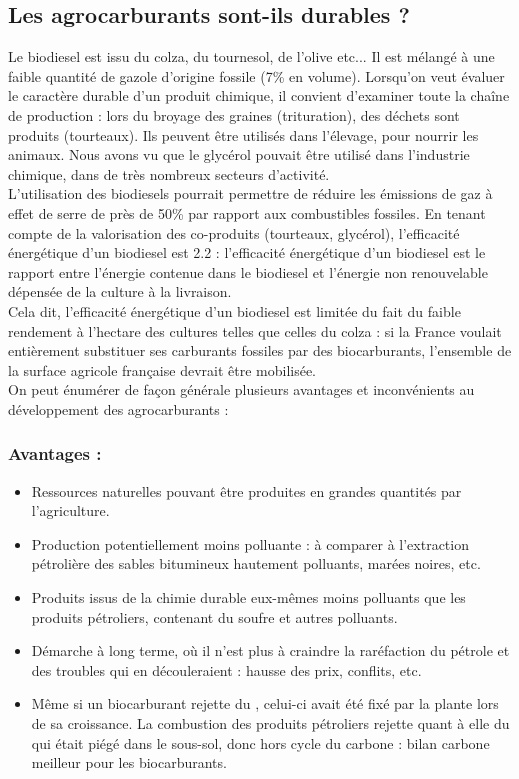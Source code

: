 \documentclass[11pt,a4paper]{report}
\begin{document}
\subsection{Les agrocarburants sont-ils durables ?}

Le biodiesel est issu du colza, du tournesol, de l'olive etc... Il est mélangé à une faible quantité de gazole d'origine fossile (7\% en volume). Lorsqu'on veut évaluer le caractère durable d'un produit chimique, il convient d'examiner toute la chaîne de production : lors du broyage des graines (trituration), des déchets sont produits (tourteaux). Ils peuvent être utilisés dans l'élevage, pour nourrir les animaux. Nous avons vu que le glycérol pouvait être utilisé dans l'industrie chimique, dans de très nombreux secteurs d'activité.\\

L'utilisation des biodiesels pourrait permettre de réduire les émissions de gaz à effet de serre de près de 50\% par rapport aux combustibles fossiles. En tenant compte de la valorisation des co-produits (tourteaux, glycérol), l'efficacité énergétique d'un biodiesel est 2.2 : l'efficacité énergétique d'un biodiesel est le rapport entre l'énergie contenue dans le biodiesel et l'énergie non renouvelable dépensée de la culture à la livraison.\\

Cela dit, l'efficacité énergétique d'un biodiesel est limitée du fait du faible rendement à l'hectare des cultures telles que celles du colza :  si la France voulait entièrement substituer ses carburants fossiles par des biocarburants, l'ensemble de la surface agricole française devrait être mobilisée.\\ 

On peut énumérer de façon générale plusieurs avantages et inconvénients au développement des agrocarburants :

\subsubsection{Avantages :}
\begin{itemize}
	\item Ressources naturelles pouvant être produites en grandes quantités par l'agriculture.
	\item Production potentiellement moins polluante : à comparer à l'extraction pétrolière des sables 			bitumineux hautement polluants, marées noires, etc.
	\item Produits issus de la chimie durable eux-mêmes moins polluants que les produits pétroliers, 			contenant du soufre et autres polluants.
	\item Démarche à long terme, où il n'est plus à craindre la raréfaction du pétrole et des troubles 			qui en découleraient : hausse des prix, conflits, etc.
	\item Même si un biocarburant rejette du , celui-ci avait été fixé par la plante lors de sa 				croissance. La combustion des produits pétroliers rejette quant à elle du  qui était piégé 				dans le sous-sol, donc hors cycle du carbone : bilan carbone meilleur pour les biocarburants.
\end{itemize}
	
\end{document}
